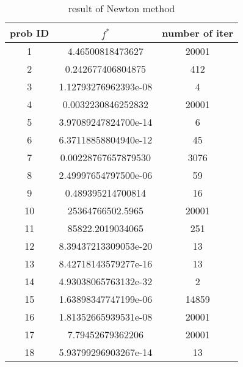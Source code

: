 \documentclass[12pt,a4paper]{article}
\begin{document}
\begin{table}
	\begin{tabular}{|c|c|c|} \hline
		prob ID & $f^*$ & number of iter\\		\hline
		1& 4.46500818473627	&20001\\
		2& 0.242677406804875&	412\\
		3 & 1.12793276962393e-08	&4\\
		4& 0.0032230846252832&	20001\\
		5 &3.97089247824700e-14&	6\\
		6 &6.37118858804940e-12&	45\\
		7 &0.00228767657879530	&3076\\
		8 &2.49997654797500e-06	&59\\
		9 &0.489395214700814	&16\\
		10& 25364766502.5965	&20001\\
		11 &85822.2019034065	&251\\
		12 &8.39437213309053e-20&	13\\
		13 &8.42718143579277e-16&	13\\
		14 &4.93038065763132e-32&	2\\
		15 &1.63898347747199e-06&	14859\\
		16 &1.81352665939531e-08&	20001\\
		17 &7.79452679362206	&20001\\
		18 &5.93799296903267e-14&	13	\\	\hline
	\end{tabular}
	\caption{result of Newton method}
\end{table}
\end{document}
